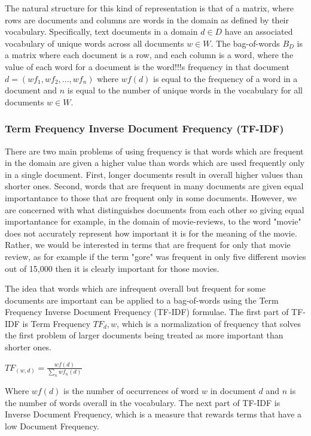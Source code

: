 The natural structure for this kind of representation is that of a matrix, where rows are documents and columns are words in the domain as defined by their vocabulary. Specifically,  text documents in a domain $d \in D$ have an associated vocabulary of unique words across all documents $w \in W$. The bag-of-words $B_D$ is a matrix where each document is a row, and each column is a word, where the value of each word for a document is the word!!!s frequency in that document $d = ({wf}_1, {wf}_2, ..., {wf}_n)$ where ${wf}(d)$ is equal to the frequency of a word in a document and $n$ is equal to the number of unique words  in the vocabulary for all documents $w \in W$.

\subsubsection{Term Frequency Inverse Document Frequency (TF-IDF)}

There are two main problems of using frequency is that words which are frequent in the domain are given a higher value than words which are used frequently only in a single document. First, longer documents result in overall higher values than shorter ones. Second, words that are frequent in many documents are given equal importantance to those that are frequent only in some documents. However, we are concerned with what distinguishes documents from each other so giving equal importantance  for example, in the domain of movie-reviews, to the word "movie" does not accurately represent how important it is for the meaning of the movie. Rather, we would be interested in terms that are frequent for only that movie review, as for example if the term "gore" was frequent in only five different movies out of 15,000 then it is clearly important for those movies. 


The idea that words which are infrequent overall but frequent for some documents are important can be applied to a bag-of-words using the Term Frequency Inverse Document Frequency (TF-IDF) formulae. The first part of TF-IDF is Term Frequency $TF_d,w$, which is a normalization of frequency that solves the first problem of larger documents being treated as more important than shorter ones. 

$TF_{(w, d)} =  \frac{{wf}(d)}{\sum_{n} {wf}_n(d)} $

Where ${wf}(d)$ is the number of occurrences of word $w$ in document $d$ and $n$ is the number of words overall in the vocabulary. The next part of TF-IDF is Inverse Document Frequency, which is a measure that rewards terms that have a low Document Frequency. 

